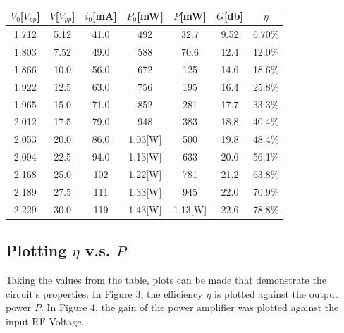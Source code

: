 \begin{center}
\begin{tabular}{|c|c|c|c|c|c|c|}
  \hline
  $V_0$[$V_{pp}$]   &   $V$[$V_{pp}$]   &   $i_0$[mA]   &   $P_0$[mW]   &
  $P$[mW]   &   $G$[db]   &   $\eta$\\
  \hline
  1.712   &   5.12  &   41.0    &   492     &   32.7  &   9.52  &   6.70\% \\
  1.803   &   7.52  &   49.0    &   588     &   70.6  &  12.4  &   12.0\% \\
  1.866   &   10.0  &   56.0    &   672     &   125   &  14.6  &   18.6\% \\
  1.922   &   12.5  &   63.0    &   756     &   195   &  16.4  &   25.8\% \\
  1.965   &   15.0  &   71.0    &   852     &   281   &  17.7  &   33.3\% \\
  2.012   &   17.5  &   79.0    &   948     &   383   &  18.8 &    40.4\% \\
  2.053   &   20.0  &   86.0    &   1.03[W]    &   500   &  19.8  &   48.4\% \\
  2.094   &   22.5  &   94.0    &   1.13[W]    &   633   &  20.6  &   56.1\% \\
  2.168   &   25.0  &   102     &   1.22[W]    &   781   &  21.2  &   63.8\% \\
  2.189   &   27.5  &   111     &   1.33[W]    &   945   &  22.0  &   70.9\% \\
  2.229   &   30.0  &   119     &   1.43[W]    &   1.13[W]  &  22.6  &   78.8\% \\
  \hline

\end{tabular}
\end{center}

\subsection{Plotting $\eta$ v.s. $P$}

Taking the values from the table, plots can be made that
demonstrate the circuit's properties.
In Figure 3, the efficiency $\eta$ is plotted against the
output power $P$. In Figure 4, the gain of the power
amplifier was plotted against the input RF Voltage.


